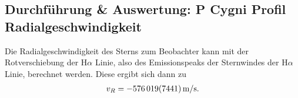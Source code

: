 \subsection{Durchführung \& Auswertung: P Cygni Profil\\Radialgeschwindigkeit}
Die Radialgeschwindigkeit des Sterns zum Beobachter kann mit der Rotverschiebung der H$\alpha $ Linie, also des Emissionspeaks der Sternwindes der H$\alpha $ Linie, berechnet werden.
Diese ergibt sich dann zu
\begin{align} 
  v_R=-\SI{576019+-7441}{m/s}
.\end{align}
